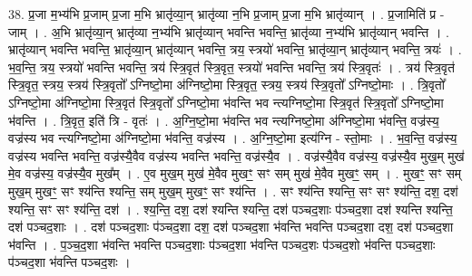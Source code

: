 \documentclass[17pt]{extarticle}
\begin{document}
38. प्र॒जा म॒भ्य॑भि प्र॒जाम् प्र॒जा म॒भि भ्रातृ॑व्या॒न् भ्रातृ॑व्या न॒भि प्र॒जाम् प्र॒जा म॒भि भ्रातृ॑व्यान् । . प्र॒जामिति॑ प्र - जाम् । . अ॒भि भ्रातृ॑व्या॒न् भ्रातृ॑व्या न॒भ्य॑भि भ्रातृ॑व्यान् भवन्ति भवन्ति॒ भ्रातृ॑व्या न॒भ्य॑भि भ्रातृ॑व्यान् भवन्ति । . भ्रातृ॑व्यान् भवन्ति भवन्ति॒ भ्रातृ॑व्या॒न् भ्रातृ॑व्यान् भवन्ति॒ त्रय॒ स्त्रयो॑ भवन्ति॒ भ्रातृ॑व्या॒न् भ्रातृ॑व्यान् भवन्ति॒ त्रयः॑ । . भ॒व॒न्ति॒ त्रय॒ स्त्रयो॑ भवन्ति भवन्ति॒ त्रय॑ स्त्रि॒वृत॑ स्त्रि॒वृत॒ स्त्रयो॑ भवन्ति भवन्ति॒ त्रय॑ स्त्रि॒वृतः॑ । . त्रय॑ स्त्रि॒वृत॑ स्त्रि॒वृत॒ स्त्रय॒ स्त्रय॑ स्त्रि॒वृतो᳚ ऽग्निष्टो॒मा अ॑ग्निष्टो॒मा स्त्रि॒वृत॒ स्त्रय॒ स्त्रय॑ स्त्रि॒वृतो᳚ ऽग्निष्टो॒माः । . त्रि॒वृतो᳚ ऽग्निष्टो॒मा अ॑ग्निष्टो॒मा स्त्रि॒वृत॑ स्त्रि॒वृतो᳚ ऽग्निष्टो॒मा भ॑वन्ति भव न्त्यग्निष्टो॒मा स्त्रि॒वृत॑ स्त्रि॒वृतो᳚ ऽग्निष्टो॒मा भ॑वन्ति । . त्रि॒वृत॒ इति॑ त्रि - वृतः॑ । . अ॒ग्नि॒ष्टो॒मा भ॑वन्ति भव न्त्यग्निष्टो॒मा अ॑ग्निष्टो॒मा भ॑वन्ति॒ वज्र॑स्य॒ वज्र॑स्य भव न्त्यग्निष्टो॒मा अ॑ग्निष्टो॒मा भ॑वन्ति॒ वज्र॑स्य । . अ॒ग्नि॒ष्टो॒मा इत्य॑ग्नि - स्तो॒माः । . भ॒व॒न्ति॒ वज्र॑स्य॒ वज्र॑स्य भवन्ति भवन्ति॒ वज्र॑स्यै॒वैव वज्र॑स्य भवन्ति भवन्ति॒ वज्र॑स्यै॒व । . वज्र॑स्यै॒वैव वज्र॑स्य॒ वज्र॑स्यै॒व मुख॒म् मुख॑ मे॒व वज्र॑स्य॒ वज्र॑स्यै॒व मुख᳚म् । . ए॒व मुख॒म् मुख॑ मे॒वैव मुखꣳ॒॒ सꣳ सम् मुख॑ मे॒वैव मुखꣳ॒॒ सम् । . मुखꣳ॒॒ सꣳ सम् मुख॒म् मुखꣳ॒॒ सꣳ श्य॑न्ति श्यन्ति॒ सम् मुख॒म् मुखꣳ॒॒ सꣳ श्य॑न्ति । . सꣳ श्य॑न्ति श्यन्ति॒ सꣳ सꣳ श्य॑न्ति॒ दश॒ दश॑ श्यन्ति॒ सꣳ सꣳ श्य॑न्ति॒ दश॑ । . श्य॒न्ति॒ दश॒ दश॑ श्यन्ति श्यन्ति॒ दश॑ पञ्चद॒शाः प॑ञ्चद॒शा दश॑ श्यन्ति श्यन्ति॒ दश॑ पञ्चद॒शाः । . दश॑ पञ्चद॒शाः प॑ञ्चद॒शा दश॒ दश॑ पञ्चद॒शा भ॑वन्ति भवन्ति पञ्चद॒शा दश॒ दश॑ पञ्चद॒शा भ॑वन्ति । . प॒ञ्च॒द॒शा भ॑वन्ति भवन्ति पञ्चद॒शाः प॑ञ्चद॒शा भ॑वन्ति पञ्चद॒शः प॑ञ्चद॒शो भ॑वन्ति पञ्चद॒शाः प॑ञ्चद॒शा भ॑वन्ति पञ्चद॒शः । \newline
\end{document}
